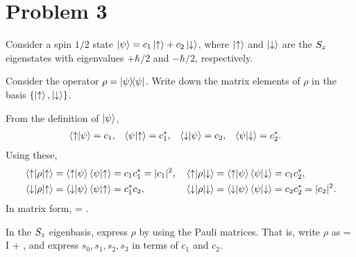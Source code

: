 \newcommand{\kpsi}{\ket{\psi}}
\newcommand{\kup}{\ket{\uparrow}}
\newcommand{\kdn}{\ket{\downarrow}}
\newcommand{\cq}{c_1}
\newcommand{\cw}{c_2}
\newcommand{\cqs}{c_1^*}
\newcommand{\cws}{c_2^*}
\newcommand{\kbpsi}{\ketbra{\psi}}

\section{Problem 3}
\begin{statement}
	Consider a spin $1/2$ state $\kpsi = \cq \kup + \cw \kdn$, where $\kup$ and $\kdn$ are the $S_z$ eigenstates with eigenvalues $+\hbar/2$ and $-\hbar/2$, respectively.
\end{statement}

\begin{problem} \label{3.1}
	Consider the operator $\rho = \kbpsi$.  Write down the matrix elements of $\rho$ in the basis $\{ \kup, \kdn \}$.
\end{problem}

\begin{solution}
	From the definition of $\kpsi$,
	\begin{align*}
		\braket{\up}{\psi} &= \cq, &
		\braket{\psi}{\up} &= \cqs, &
		\braket{\dn}{\psi} &= \cw, &
		\braket{\psi}{\dn} &= \cws.
	\end{align*}
	Using these,
	\begin{align*}
		\mel{\up}{\rho}{\up} &= \braket{\up}{\psi} \braket{\psi}{\up} = \cq \cqs = |\cq|^2, &
		\mel{\up}{\rho}{\dn} &= \braket{\up}{\psi} \braket{\psi}{\dn} = \cq \cws, \\
		\mel{\dn}{\rho}{\up} &= \braket{\dn}{\psi} \braket{\psi}{\up} = \cqs \cw, &
		\mel{\dn}{\rho}{\dn} &= \braket{\dn}{\psi} \braket{\psi}{\dn} = \cw \cws = |\cw|^2.
	\end{align*}
	In matrix form,
	\beqn \label{matrho}
		\rho = \mqty[ |\cq|^2 & \cq \cws \\ \cqs \cw & |\cw|^2 ].
	\eeqn
\vfix
\end{solution}

\newcommand{\soo}{s_0}
\newcommand{\sq}{s_1}
\newcommand{\sw}{s_2}
\newcommand{\se}{s_3}
\newcommand{\vs}{\vec{s}}

\newcommand{\Recq}{\Re(\cq)}
\newcommand{\Imcq}{\Im(\cq)}
\newcommand{\Recw}{\Re(\cw)}
\newcommand{\Imcw}{\Im(\cw)}

\newcommand{\sds}{\vs \cdot \vsig}

\begin{problem}
	In the $S_z$ eigenbasis, express $\rho$ by using the Pauli matrices.  That is, write $\rho$ as
	\beqn \label{exprho}
		\rho = \frac{\soo}{2} I +  \sds,
	\eeqn
	and express $\soo, \sq, \sw, \se$ in terms of $\cq$ and $\cw$.
\end{problem}

